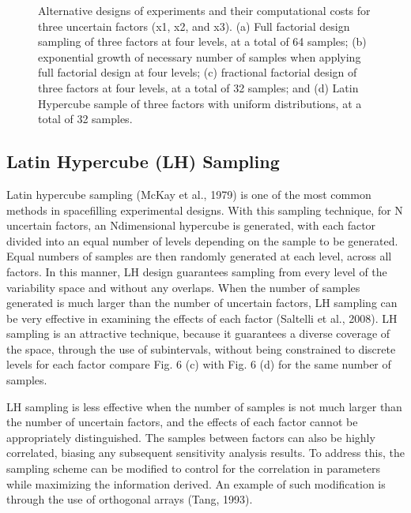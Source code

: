 \documentclass[letterpaper,10pt,english]{sphinxmanual}
\let\sphinxpxdimen\pdfpxdimen\else\newdimen\sphinxpxdimen
\begin{document}
\begin{figure}[htbp]
\centering
\capstart

\noindent\sphinxincludegraphics[width=500\sphinxpxdimen]{{figure5_alternative_designs}.png}
\caption{Alternative designs of experiments and their computational costs for three uncertain factors (x1, x2, and x3). (a) Full factorial design sampling of three factors at four levels, at a total of 64 samples; (b) exponential growth of necessary number of samples when applying full factorial design at four levels; (c) fractional factorial design of three factors at four levels, at a total of 32 samples; and (d) Latin Hypercube sample of three factors with uniform distributions, at a total of 32 samples.}\label{\detokenize{3_sensitivity_analysis_the_basics:id4}}\end{figure}


\subsection{Latin Hypercube (LH) Sampling}
\label{\detokenize{3_sensitivity_analysis_the_basics:latin-hypercube-lh-sampling}}
\sphinxAtStartPar
Latin hypercube sampling (McKay et al., 1979) is one of the most common methods in space\sphinxhyphen{}filling experimental designs. With this sampling technique, for N uncertain factors, an N\sphinxhyphen{}dimensional hypercube is generated, with each factor divided into an equal number of levels depending on the sample to be generated. Equal numbers of samples are then randomly generated at each level, across all factors. In this manner, LH design guarantees sampling from every level of the variability space and without any overlaps. When the number of samples generated is much larger than the number of uncertain factors, LH sampling can be very effective in examining the effects of each factor (Saltelli et al., 2008). LH sampling is an attractive technique, because it guarantees a diverse coverage of the space, through the use of subintervals, without being constrained to discrete levels for each factor \sphinxhyphen{} compare Fig. 6 (c) with Fig. 6 (d) for the same number of samples.

\sphinxAtStartPar
LH sampling is less effective when the number of samples is not much larger than the number of uncertain factors, and the effects of each factor cannot be appropriately distinguished. The samples between factors can also be highly correlated, biasing any subsequent sensitivity analysis results. To address this, the sampling scheme can be modified to control for the correlation in parameters while maximizing the information derived. An example of such modification is through the use of orthogonal arrays (Tang, 1993).
\end{document}
